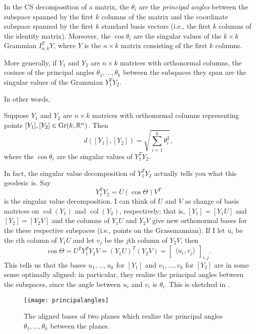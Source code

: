 In the CS decomposition of a matrix, the $\theta_i$ are the \emph{principal angles} between the subspace spanned by the first $k$ columns of the matrix and the coordinate subspace spanned by the first $k$ standard basis vectors (i.e., the first $k$ columns of the identity matrix). Moreover, the $\cos \theta_i$ are the singular values of the $k \times k$ Grammian $I_{n,k}^T Y$, where $Y$ is the $n \times k$ matrix consisting of the first $k$ columns.

More generally, if $Y_1$ and $Y_2$ are $n \times k$ matrices with orthonormal columns, the cosines of the principal angles $\theta_1, \dots , \theta_k$ between the subspaces they span are the singular values of the Grammian $Y_1^T Y_2$. 

 In other words, 
 
\begin{theorem}\label{thm:distance in grassmannian}
	Suppose $Y_1$ and $Y_2$ are $n \times k$ matrices with orthonormal columns representing points $[Y_1],[Y_2] \in \operatorname{Gr}(k,\mathbb{R}^n)$. Then
	\[
		d([Y_1], [Y_2]) = \sqrt{\sum_{i=1}^k \theta_i^2},
	\]
	where the $\cos \theta_i$ are the singular values of $Y_1^T Y_2$. 
\end{theorem}
 
In fact, the singular value decomposition of $Y_1^TY_2$ actually tells you what this geodesic is. Say
\[
	Y_1^TY_2 = U (\cos \Theta) V^T
\]
is the singular value decomposition. I can think of $U$ and $V$ as change of basis matrices on $\operatorname{col}(Y_1)$ and $\operatorname{col}(Y_2)$, respectively; that is, $[Y_1] = [Y_1U]$ and $[Y_2] = [Y_2V]$ and the columns of $Y_1U$ and $Y_2V$ give new orthonormal bases for the these respective subspaces (i.e., points on the Grassmannian). If I let $u_i$ be the $i$th column of $Y_1U$ and let $v_j$ be the $j$th column of $Y_2V$, then 
\[
	\cos \Theta = U^TY_1^TY_2V = (Y_1U)^T (Y_2V) = \begin{bmatrix} \langle u_i, v_j\rangle \end{bmatrix}_{i,j}.
\]
This tells us that the bases $u_1, \dots , u_k$ for $[Y_1]$ and $v_1, \dots , v_k$ for $[Y_2]$ are in some sense optimally aligned: in particular, they realize the principal angles between the subspaces, since the angle between $u_i$ and $v_i$ is $\theta_i$. This is sketched in .

\begin{figure}[htbp]
	\centering
		\texttt{[image: principalangles]}
	\caption{The aligned bases of two planes which realize the principal angles $\theta_1, \dots , \theta_k$ between the planes.}
	\label{fig:principal angles}
\end{figure}


